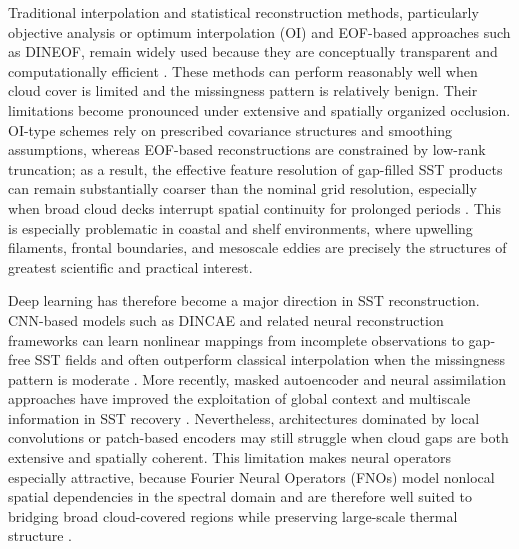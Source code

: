 \documentclass[12pt,reqno]{amsart}
\begin{document}
Traditional interpolation and statistical reconstruction methods, particularly objective analysis or optimum interpolation (OI) and EOF-based approaches such as DINEOF, remain widely used because they are conceptually transparent and computationally efficient \cite{reynolds_smith_1994,beckers_rixen_2003,alvera_azcarate_2005}. These methods can perform reasonably well when cloud cover is limited and the missingness pattern is relatively benign. Their limitations become pronounced under extensive and spatially organized occlusion. OI-type schemes rely on prescribed covariance structures and smoothing assumptions, whereas EOF-based reconstructions are constrained by low-rank truncation; as a result, the effective feature resolution of gap-filled SST products can remain substantially coarser than the nominal grid resolution, especially when broad cloud decks interrupt spatial continuity for prolonged periods \cite{alvera_azcarate_2005,chin_2017}. This is especially problematic in coastal and shelf environments, where upwelling filaments, frontal boundaries, and mesoscale eddies are precisely the structures of greatest scientific and practical interest.

Deep learning has therefore become a major direction in SST reconstruction. CNN-based models such as DINCAE and related neural reconstruction frameworks can learn nonlinear mappings from incomplete observations to gap-free SST fields and often outperform classical interpolation when the missingness pattern is moderate \cite{barth_2020_dincae,young_2024}. More recently, masked autoencoder and neural assimilation approaches have improved the exploitation of global context and multiscale information in SST recovery \cite{goh_2024_maesstro,beauchamp_2025}. Nevertheless, architectures dominated by local convolutions or patch-based encoders may still struggle when cloud gaps are both extensive and spatially coherent. This limitation makes neural operators especially attractive, because Fourier Neural Operators (FNOs) model nonlocal spatial dependencies in the spectral domain and are therefore well suited to bridging broad cloud-covered regions while preserving large-scale thermal structure \cite{li_2021_fno}.
\end{document}
